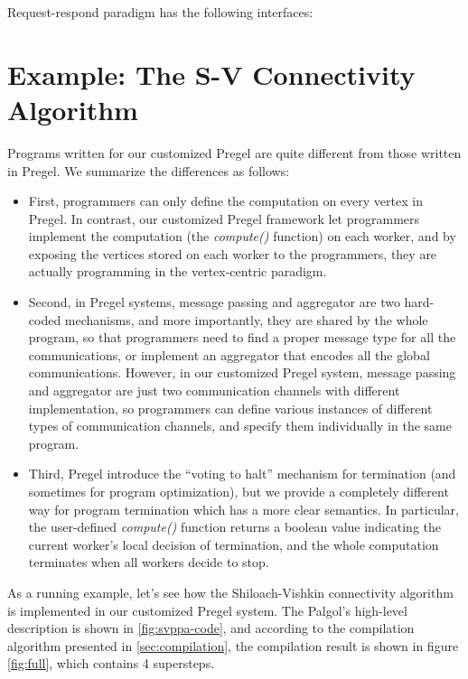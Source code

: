 \documentclass{sokendai_thesis} %
\begin{document}
Request-respond paradigm has the following interfaces:

\section{Example: The S-V Connectivity Algorithm}

Programs written for our customized Pregel are quite different from those written in Pregel.
We summarize the differences as follows:
\begin{itemize}\setlength\itemsep{0em}
\item
 First, programmers can only define the computation on every vertex in Pregel.
 In contrast, our customized Pregel framework let programmers implement the computation (the \emph{compute()} function) on each worker, and by exposing the vertices stored on each worker to the programmers, they are actually programming in the vertex-centric paradigm.
\item
 Second, in Pregel systems, message passing and aggregator are two hard-coded mechanisms, and more importantly, they are shared by the whole program, so that programmers need to find a proper message type for all the communications, or implement an aggregator that encodes all the global communications.
 However, in our customized Pregel system, message passing and aggregator are just two communication channels with different implementation, so programmers can define various instances of different types of communication channels, and specify them individually in the same program.
\item
 Third, Pregel introduce the ``voting to halt'' mechanism for termination (and sometimes for program optimization), but we provide a completely different way for program termination which has a more clear semantics.
 In particular, the user-defined \emph{compute()} function returns a boolean value indicating the current worker's local decision of termination, and the whole computation terminates when all workers decide to stop.
\end{itemize}

As a running example, let's see how the Shiloach-Vishkin connectivity algorithm~\cite{connectivity} is implemented in our customized Pregel system.
The Palgol's high-level description is shown in \autoref{fig:svppa-code}, and according to the compilation algorithm presented in \autoref{sec:compilation}, the compilation result is shown in figure \autoref{fig:full}, which contains 4 supersteps.
\end{document}

